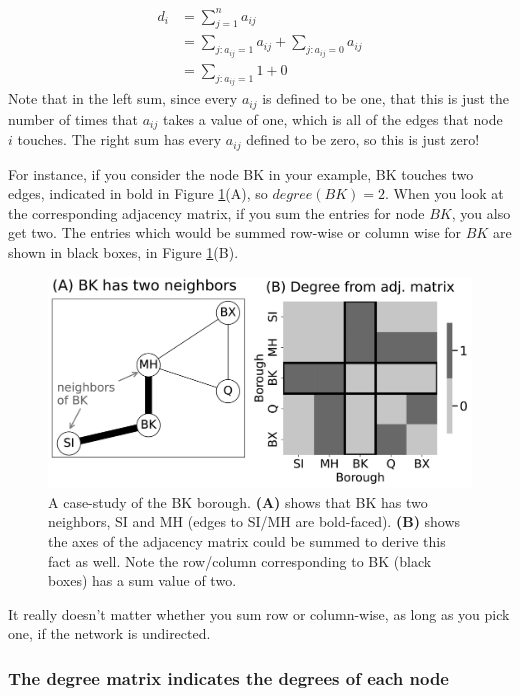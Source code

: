 \begin{align*}
    d_i &= \sum_{j = 1}^n a_{ij} \\
    &= \sum_{j : a_{ij} = 1} a_{ij} + \sum_{j : a_{ij} = 0}a_{ij} \\
    &= \sum_{j : a_{ij} = 1}1 + 0
\end{align*}
Note that in the left sum, since every $a_{ij}$ is defined to be one, that this is just the number of times that $a_{ij}$ takes a value of one, which is all of the edges that node $i$ touches. The right sum has every $a_{ij}$ defined to be zero, so this is just zero!

For instance, if you consider the node BK in your example, BK touches two edges, indicated in bold in  Figure \ref{fig:ch4:degree}(A), so $degree({BK}) = 2$. When you look at the corresponding adjacency matrix, if you sum the entries for node ${BK}$, you also get two. The entries which would be summed row-wise or column wise for ${BK}$ are shown in black boxes, in Figure \ref{fig:ch4:degree}(B).

\begin{figure}[h]
    \centering
    \includegraphics[width=0.8\linewidth]{representations/ch4/Images/degree.png}
    \caption[Deriving node degree from layout and adjacency matrix heatmaps]{A case-study of the BK borough. \textbf{(A)} shows that BK has two neighbors, SI and MH (edges to SI/MH are bold-faced). \textbf{(B)} shows the axes of the adjacency matrix could be summed to derive this fact as well. Note the row/column corresponding to BK (black boxes) has a sum value of two.}
    \label{fig:ch4:degree}
\end{figure}

It really doesn't matter whether you sum row or column-wise, as long as you pick one, if the network is undirected.

\subsubsection{The degree matrix indicates the degrees of each node}

